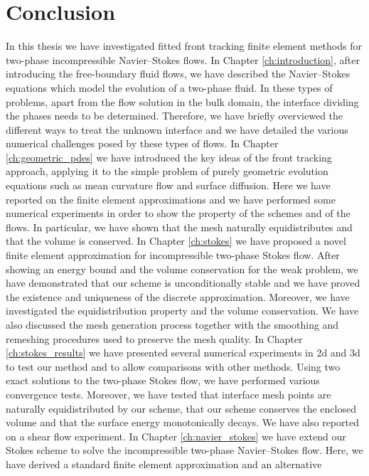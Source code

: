 \chapter{\sc Conclusion}\label{ch:conclusion}

In this thesis we have investigated fitted front tracking finite element
methods for two-phase incompressible Navier--Stokes flows. In Chapter
\ref{ch:introduction}, after introducing the free-boundary fluid flows, we have
described the Navier--Stokes equations which model the evolution of a two-phase
fluid. In these types of problems, apart from the flow solution in the bulk
domain, the interface dividing the phases needs to be determined. Therefore, we
have briefly overviewed the different ways to treat the unknown interface and we
have detailed the various numerical challenges posed by these types of flows.
In Chapter \ref{ch:geometric_pdes} we have introduced the key ideas of the
front tracking approach, applying it to the simple problem of purely geometric
evolution equations such as mean curvature flow and surface diffusion. Here we
have reported on the finite element approximations and we have performed some
numerical experiments in order to show the property of the schemes and of the
flows. In particular, we have shown that the mesh naturally equidistributes and
that the volume is conserved. In Chapter \ref{ch:stokes} we have proposed a
novel finite element approximation for incompressible two-phase Stokes flow.
After showing an energy bound and the volume conservation for the weak problem,
we have demonstrated that our scheme is unconditionally stable and we have
proved the existence and uniqueness of the discrete approximation. Moreover, we
have investigated the equidistribution property and the volume conservation. We
have also discussed the mesh generation process together with the smoothing and
remeshing procedures used to preserve the mesh quality. In Chapter
\ref{ch:stokes_results} we have presented several numerical experiments in 2d
and 3d to test our method and to allow comparisons with other methods. Using
two exact solutions to the two-phase Stokes flow, we have performed various
convergence tests. Moreover, we have tested that interface mesh points are
naturally equidistributed by our scheme, that our scheme conserves the enclosed
volume and that the surface energy monotonically decays. We have also reported
on a shear flow experiment. In Chapter \ref{ch:navier_stokes} we have extend
our Stokes scheme to solve the incompressible two-phase Navier--Stokes flow.
Here, we have derived a standard finite element approximation and an alternative
